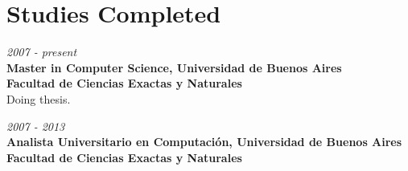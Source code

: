 \section{Studies Completed}

\begin{large}
    \textit{2007 - present}\\
	   \textbf{Master in Computer Science, Universidad de Buenos Aires}\\
      \textbf{Facultad de Ciencias Exactas y Naturales}\\
	  Doing thesis.\\
\end{large}

\begin{large}
\noindent    \textit{2007 - 2013}\\
	   \textbf{Analista Universitario en Computación, Universidad de Buenos Aires}\\
      \textbf{Facultad de Ciencias Exactas y Naturales}\\
\end{large}

